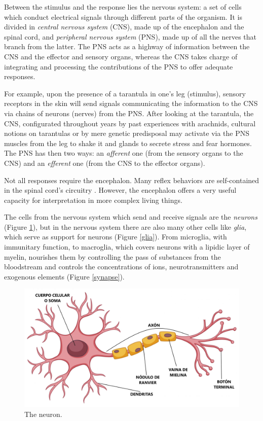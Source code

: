 Between the stimulus and the response lies the nervous system: a set of cells which conduct electrical signals through different parts of the organism. It is divided in \textit{central nervous system} (CNS), made up of the encephalon and the spinal cord, and \textit{peripheral nervous system} (PNS), made up of all the nerves that branch from the latter. The PNS acts as a highway of information between the CNS and the effector and sensory organs, whereas the CNS takes charge of integrating and processing the contributions of the PNS to offer adequate responses.

For example, upon the presence of a tarantula in one's leg (stimulus), sensory receptors in the skin will send signals communicating the information to the CNS via chains of neurons (nerves) from the PNS. After looking at the tarantula, the CNS, configurated throughout years by past experiences with arachnids, cultural notions on tarantulas or by mere genetic predisposal may activate via the PNS muscles from the leg to shake it and glands to secrete stress and fear hormones. The PNS has then two ways: an \textit{afferent} one (from the sensory organs to the CNS) and an \textit{efferent} one (from the CNS to the effector organs).

Not all responses require the encephalon. Many reflex behaviors are self-contained in the spinal cord's circuitry . However, the encephalon offers a very useful capacity for interpretation in more complex living things.

The cells from the nervous system which send and receive signals are the \textit{neurons} (Figure \ref{neuron}), but in the nervous system there are also many other cells like \textit{glia}, which serve as support for neurons (Figure \ref{glia}). From microglia, with immunitary function, to macroglia, which covers neurons with a lipidic layer of myelin, nourishes them by controlling the pass of substances from the bloodstream and controls the concentrations of ions, neurotransmitters and exogenous elements (Figure \ref{synapse}).

\begin{figure}[H]
	\centering
	\includegraphics[width=\linewidth]{media/5-neuron.jpg}
	\caption{The neuron.}
	\label{neuron}
\end{figure}


